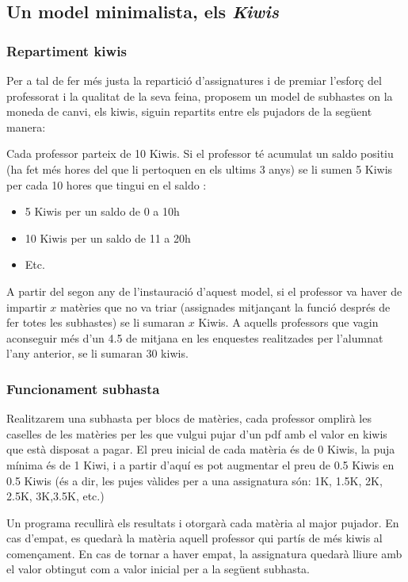 \documentclass[10pt,twocolumn]{article}
\begin{document}
\subsection{Un model minimalista, els \textit{Kiwis}}
\subsubsection{Repartiment kiwis}
Per a tal de fer més justa la repartició d'assignatures i de premiar l'esforç del professorat i la qualitat de la seva feina, proposem un model de subhastes on la moneda de canvi, els kiwis, siguin repartits entre els pujadors de la següent manera:

Cada professor parteix de 10 Kiwis.
Si el professor té acumulat un saldo positiu (ha fet més hores del que li pertoquen en els ultims 3 anys) se li sumen 5 Kiwis per cada 10 hores que tingui en el saldo : 
\begin{itemize}
	\item 5 Kiwis per un saldo de 0 a 10h
	\item 10 Kiwis per un saldo de 11 a 20h
	\item  Etc.
\end{itemize}
A partir del segon any de l'instauració d'aquest model, si el professor va haver de impartir $x$ matèries que no va triar (assignades mitjançant la funció després de fer totes les subhastes) se li sumaran $x$ Kiwis. A aquells professors que vagin aconseguir més d'un 4.5 de mitjana en les enquestes realitzades per l'alumnat l'any anterior,  se li sumaran 30 kiwis. 

\subsubsection{Funcionament subhasta}
Realitzarem una subhasta per blocs de matèries, cada professor omplirà les caselles de les matèries per les que vulgui pujar d'un pdf amb el valor en kiwis que està disposat  a pagar. El preu inicial de cada matèria és de 0 Kiwis, la puja mínima és de 1 Kiwi, i a partir d'aquí es pot augmentar el preu de 0.5 Kiwis en 0.5 Kiwis (és a dir, les pujes vàlides per a una assignatura són: 1K, 1.5K, 2K, 2.5K, 3K,3.5K, etc.)

Un programa recullirà els resultats i otorgarà cada matèria al major pujador. En cas d'empat, es quedarà la matèria aquell professor qui partís de més kiwis al començament. En cas de tornar a haver empat, la assignatura quedarà lliure amb el valor obtingut com a valor inicial per a la següent subhasta.
\end{document}
